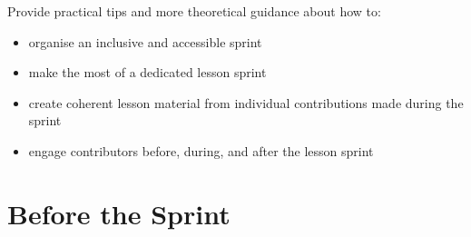 \documentclass[
]{book}
\providecommand{\tightlist}{%
  \setlength{\itemsep}{0pt}\setlength{\parskip}{0pt}}
\begin{document}
Provide practical tips and more theoretical guidance about how to:

\begin{itemize}
\tightlist
\item
  organise an inclusive and accessible sprint
\item
  make the most of a dedicated lesson sprint
\item
  create coherent lesson material from individual contributions made during the sprint
\item
  engage contributors before, during, and after the lesson sprint
\end{itemize}

\hypertarget{before-the-sprint}{%
\section{Before the Sprint}\label{before-the-sprint}}
\end{document}
